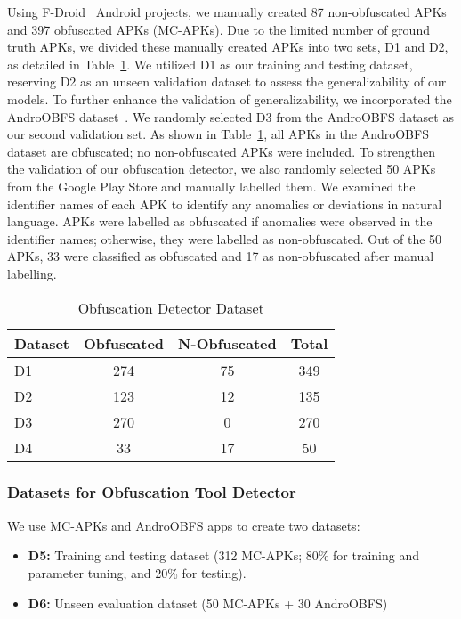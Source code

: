 Using F-Droid~\cite{fdroid} Android projects, we manually created 87 non-obfuscated APKs and 397 obfuscated APKs (MC-APKs). Due to the limited number of ground truth APKs, we divided these manually created APKs into two sets, D1 and D2, as detailed in Table~\ref{tab:obfuscation_detection_dataset}. We utilized D1 as our training and testing dataset, reserving D2 as an unseen validation dataset to assess the generalizability of our models. To further enhance the validation of generalizability, we incorporated the AndroOBFS dataset~\cite{androobfs}. We randomly selected D3 from the AndroOBFS dataset as our second validation set. As shown in Table~\ref{tab:obfuscation_detection_dataset}, all APKs in the AndroOBFS dataset are obfuscated; no non-obfuscated APKs were included. To strengthen the validation of our obfuscation detector, we also randomly selected 50 APKs from the Google Play Store and manually labelled them. We examined the identifier names of each APK to identify any anomalies or deviations in natural language. APKs were labelled as obfuscated if anomalies were observed in the identifier names; otherwise, they were labelled as non-obfuscated. Out of the 50 APKs, 33 were classified as obfuscated and 17 as non-obfuscated after manual labelling.

\begin{table}[!h]
    \centering
    \caption{Obfuscation Detector Dataset}
    \label{tab:obfuscation_detection_dataset}
    \begin{tabular}{p{2.0cm}ccc}
        \hline
        \textbf{Dataset} & \textbf{Obfuscated} & \textbf{N-Obfuscated} &\textbf{Total}\\
        \hline
        D1 & 274& 75& 349\\  
        D2 & 123& 12& 135\\ 
        D3 & 270& 0& 270\\ 
        D4 & 33& 17& 50\\
        \hline
    \end{tabular}
\end{table}

\subsubsection{Datasets for Obfuscation Tool Detector}

We use MC-APKs and AndroOBFS apps to create two datasets:
\begin{itemize}
    \item {\bf D5:} Training and testing dataset (312 MC-APKs; 80\% for training and parameter tuning, and 20\% for testing).
    \item {\bf D6:} Unseen evaluation dataset (50 MC-APKs + 30 AndroOBFS)
\end{itemize}

